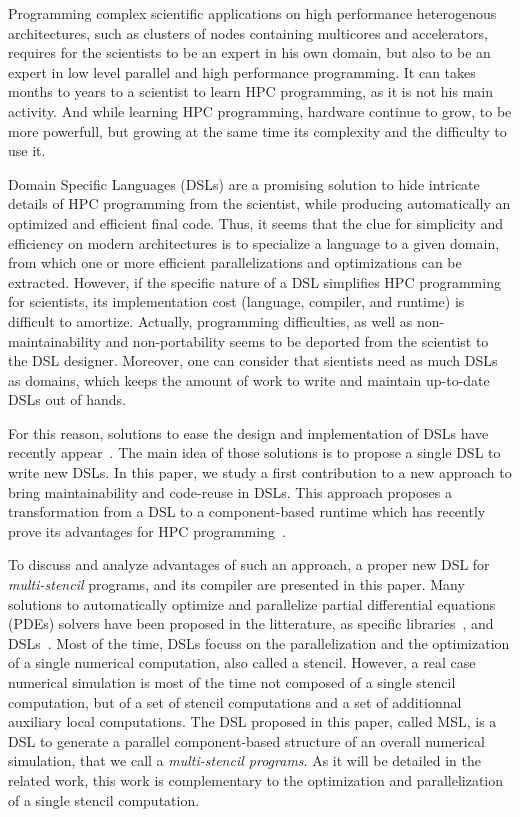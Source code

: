 Programming complex scientific applications on high performance heterogenous architectures, such as clusters of nodes containing multicores and accelerators, requires for the scientists to be an expert in his own domain, but also to be an expert in low level parallel and high performance programming. It can takes months to years to a scientist to learn HPC programming, as it is not his main activity. And while learning HPC programming, hardware continue to grow, to be more powerfull, but growing at the same time its complexity and the difficulty to use it.

Domain Specific Languages (DSLs) are a promising solution to hide intricate details of HPC programming from the scientist, while producing automatically an optimized and efficient final code. Thus, it seems that the clue for simplicity and efficiency on modern architectures is to specialize a language to a given domain, from which one or more efficient parallelizations and optimizations can be extracted.
However, if the specific nature of a DSL simplifies HPC programming for scientists, its implementation cost (language, compiler, and runtime) is difficult to amortize. Actually, programming difficulties, as well as non-maintainability and non-portability seems to be deported from the scientist to the DSL designer. Moreover, one can consider that sientists need as much DSLs as domains, which keeps the amount of work to write and maintain up-to-date DSLs out of hands.

For this reason, solutions to ease the design and implementation of DSLs have recently appear~\cite{Fernandez:2014:DFL:2691166.2691168}. The main idea of those solutions is to propose a single DSL to write new DSLs. In this paper, we study a first contribution to a new approach to bring maintainability and code-reuse in DSLs. This approach proposes a transformation from a DSL to a component-based runtime which has recently prove its advantages for HPC programming~\cite{l2c}.

To discuss and analyze advantages of such an approach, a proper new DSL for \emph{multi-stencil} programs, and its compiler are presented in this paper. Many solutions to automatically optimize and parallelize partial differential equations (PDEs) solvers have been proposed in the litterature, as specific libraries~\cite{petsc-efficient,Trilinos-Overview,CPE:CPE3494}, and DSLs~\cite{spaaTangCKLL11,citeulike12258902,Giles2011,DeVito2011LDS}. Most of the time, DSLs focuss on the parallelization and the optimization of a single numerical computation, also called a stencil.
However, a real case numerical simulation is most of the time not composed of a single stencil computation, but of a set of stencil computations and a set of additionnal auxiliary local computations. The DSL proposed in this paper, called MSL, is a DSL to generate a parallel component-based structure of an overall numerical simulation, that we call a \emph{multi-stencil programs}. As it will be detailed in the related work, this work is complementary to the optimization and parallelization of a single stencil computation.

